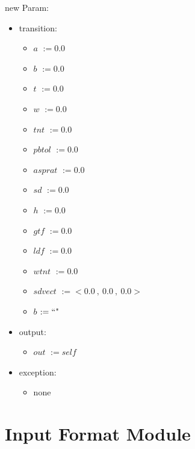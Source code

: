 \documentclass[12pt,fleqn]{article}
\begin{document}
\noindent new Param:
\begin{itemize}
\item transition: \begin{itemize}
                        \item[] $a$ \tabto{2cm} $:= 0.0$
                        \item[] $b$ \tabto{2cm} $:= 0.0$
                        \item[] $t$ \tabto{2cm} $ := 0.0$
                        \item[] $w$ \tabto{2cm} $ := 0.0$
                        \item[] $tnt$ \tabto{2cm} $ := 0.0$
                        \item[] $pbtol$ \tabto{2cm} $ := 0.0$
                        \item[] $asprat$ \tabto{2cm} $ := 0.0$
                        \item[] $sd$ \tabto{2cm} $ := 0.0$
                        \item[] $h$ \tabto{2cm} $ := 0.0$
                        \item[] $gtf$ \tabto{2cm} $ := 0.0$
                        \item[] $ldf$ \tabto{2cm} $ := 0.0$
                        \item[] $wtnt$ \tabto{2cm} $ := 0.0$
                        \item[] $sdvect$ \tabto{2cm} $ :=<0.0~,~ 0.0~,~ 0.0>$
                        \item[] $b$ \tabto{2cm} $ := \textsc{``"}$
                        
                        \end{itemize}
\item output: \begin{itemize}
                    \item[] $out$ \tabto{2cm} $:= \mathit{self}$
                    \end{itemize}
\item exception: \begin{itemize}
                        \item[] none
                        \end{itemize}
\end{itemize}

\newpage

\section* {Input Format Module}
\end{document}
